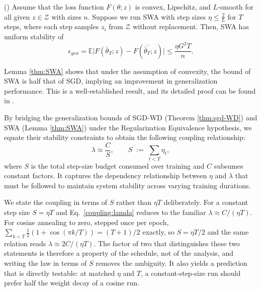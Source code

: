 \begin{lemma}{\rm (\citet[Theorem 4.1]{pmlr-v235-wang24bl})}\label{thm:SWA}
Assume that the loss function $F(\theta;z)$ is convex, Lipschitz, and $L$-smooth for all given $z\in\mathcal{Z}$ with sizes $n$. Suppose we run SWA with step sizes $\eta \leq \frac{2}{L}$ for $T$ steps, where each step samples $z_i$ from $\mathcal{Z}$ without replacement. Then, SWA has uniform stability of
\begin{equation}
  \epsilon_{gen} = \mathbb{E}\vert F(\bar{\theta}_T;z)-F(\bar{\theta}^{\prime}_T;z)\vert \leq \frac{\eta G^2 T}{n}.
 \end{equation}
\end{lemma}

\begin{remark}
Lemma \ref{thm:SWA} shows that under the assumption of convexity, the bound of SWA is half that of SGD, implying an improvement in generalization performance. This is a well-established result, and its detailed proof can be found in \cite{pmlr-v235-wang24bl,hardt2016train,xiao2022stability}. 
\end{remark}

By bridging the generalization bounds of SGD-WD (Theorem \ref{thm:sgd-WD}) and SWA (Lemma \ref{thm:SWA}) under the Regularization Equivalence hypothesis, we equate their stability constraints to obtain the following coupling relationship:
\begin{equation}\label{coupling:lamda}
\lambda \approx \frac{C}{S}, \qquad S \;:=\; \sum_{t<T}\eta_t, %
\end{equation}
where $S$ is the total step-size budget consumed over training and $C$ subsumes constant factors. It captures the dependency relationship between $\eta$ and $\lambda$ that must be followed to maintain system stability across varying training durations.

We state the coupling in terms of $S$ rather than $\eta T$ deliberately. For a constant step size $S=\eta T$ and Eq.~\eqref{coupling:lamda} reduces to the familiar $\lambda \approx C/(\eta T)$. For cosine annealing to zero, stepped once per epoch, $\sum_{k<T}\tfrac{1}{2}\left(1+\cos(\pi k/T)\right) = (T+1)/2$ exactly, so $S = \eta T/2$ and the same relation reads $\lambda \approx 2C/(\eta T)$. The factor of two that distinguishes these two statements is therefore a property of the schedule, not of the analysis, and writing the law in terms of $S$ removes the ambiguity. It also yields a prediction that is directly testable: at matched $\eta$ and $T$, a constant-step-size run should prefer half the weight decay of a cosine run.

